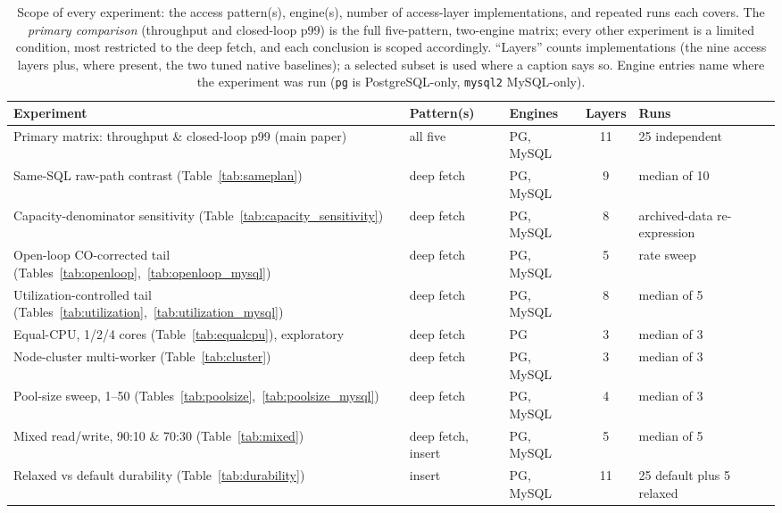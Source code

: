 \documentclass[11pt,a4paper]{article}
\begin{document}
{\footnotesize
  \begin{longtable}{@{}p{} p{} p{} c p{}@{}}
  \caption{Scope of every experiment: the access pattern(s), engine(s), number of
    access-layer implementations, and repeated runs each covers. The \emph{primary
    comparison} (throughput and closed-loop p99) is the full five-pattern, two-engine
    matrix; every other experiment is a limited condition, most restricted to the
    deep fetch, and each conclusion is scoped accordingly. ``Layers'' counts
    implementations (the nine access layers plus, where present, the two tuned native
    baselines); a selected subset is used where a caption says so. Engine
    entries name where the experiment was run (\texttt{pg} is PostgreSQL-only,
    \texttt{mysql2} MySQL-only).}
  \label{tab:scope}\\
    \toprule
    Experiment & Pattern(s) & Engines & Layers & Runs \\
    \midrule
    Primary matrix: throughput \& closed-loop p99 (main paper) & all five & PG, MySQL & 11 & 25 independent \\
    Same-SQL raw-path contrast (Table~\ref{tab:sameplan}) & deep fetch & PG, MySQL & 9 & median of 10 \\
    Capacity-denominator sensitivity (Table~\ref{tab:capacity_sensitivity}) & deep fetch & PG, MySQL & 8 & archived-data re-expression \\
    Open-loop CO-corrected tail (Tables~\ref{tab:openloop},~\ref{tab:openloop_mysql}) & deep fetch & PG, MySQL & 5 & rate sweep \\
    Utilization-controlled tail (Tables~\ref{tab:utilization},~\ref{tab:utilization_mysql}) & deep fetch & PG, MySQL & 8 & median of 5 \\
    Equal-CPU, 1/2/4 cores (Table~\ref{tab:equalcpu}), exploratory & deep fetch & PG & 3 & median of 3 \\
    Node-cluster multi-worker (Table~\ref{tab:cluster}) & deep fetch & PG, MySQL & 3 & median of 3 \\
    Pool-size sweep, 1--50 (Tables~\ref{tab:poolsize},~\ref{tab:poolsize_mysql}) & deep fetch & PG, MySQL & 4 & median of 3 \\
    Mixed read/write, 90:10 \& 70:30 (Table~\ref{tab:mixed}) & deep fetch, insert & PG, MySQL & 5 & median of 5 \\
    Relaxed vs default durability (Table~\ref{tab:durability}) & insert & PG, MySQL & 11 & 25 default plus 5 relaxed \\

\end{longtable}}
\end{document}
